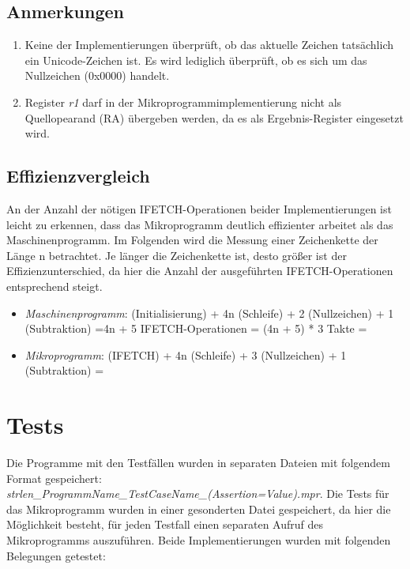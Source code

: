 \documentclass[12pt,a4paper]{article}
\begin{document}
\subsection{Anmerkungen}
\begin{enumerate}
\item Keine der Implementierungen überprüft, ob das aktuelle Zeichen tatsächlich ein Unicode-Zeichen ist. Es wird lediglich überprüft, ob es sich um das Nullzeichen (0x0000) handelt.
\item Register \emph{r1} darf in der Mikroprogrammimplementierung nicht als Quellopearand (RA) übergeben werden, da es als Ergebnis-Register eingesetzt wird.
\end{enumerate}



\subsection{Effizienzvergleich}

An der Anzahl der nötigen IFETCH-Operationen beider Implementierungen ist leicht zu erkennen, dass das Mikroprogramm deutlich effizienter arbeitet als das Maschinenprogramm. Im Folgenden wird die Messung einer Zeichenkette der Länge n betrachtet. Je länger die Zeichenkette ist, desto größer ist der Effizienzunterschied, da hier die Anzahl der ausgeführten IFETCH-Operationen entsprechend steigt.

\begin{itemize}
\item \emph{Maschinenprogramm}: (Initialisierung) + 4n (Schleife) + 2 (Nullzeichen) + 1 (Subtraktion) =\newline 4n + 5 IFETCH-Operationen = (4n + 5) * 3 Takte =
\item \emph{Mikroprogramm}: (IFETCH) + 4n (Schleife) + 3 (Nullzeichen) + 1 (Subtraktion) =
\end{itemize}

\newpage

\section{Tests}

Die Programme mit den Testfällen wurden in separaten Dateien mit folgendem Format gespeichert: \emph{strlen\_ProgrammName\_TestCaseName\_(Assertion=Value).mpr}. Die Tests für das Mikroprogramm wurden in einer gesonderten Datei gespeichert, da hier die Möglichkeit besteht, für jeden Testfall einen separaten Aufruf des Mikroprogramms auszuführen. Beide Implementierungen wurden mit folgenden Belegungen getestet:
\end{document}
